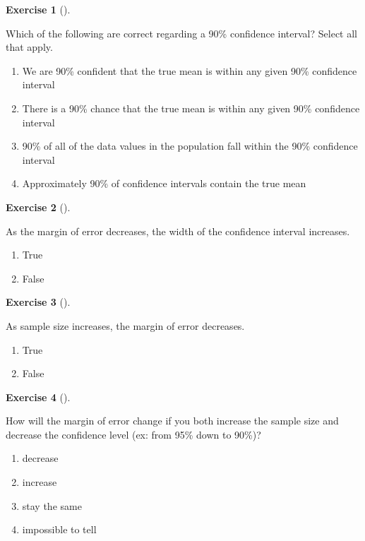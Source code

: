 \documentclass[
  letterpaper,
  DIV=11,
  numbers=noendperiod]{scrreprt}
\providecommand{\tightlist}{%
  \setlength{\itemsep}{0pt}\setlength{\parskip}{0pt}}\usepackage{longtable,booktabs,array}
\theoremstyle{definition}
\newtheorem{exercise}{Exercise}[chapter]
\theoremstyle{remark}
\begin{document}
\begin{exercise}[]\protect\hypertarget{exr-ch10-c02}{}\label{exr-ch10-c02}

Which of the following are correct regarding a 90\% confidence interval?
Select all that apply.

\begin{enumerate}
\def\labelenumi{\alph{enumi})}
\tightlist
\item
  We are 90\% confident that the true mean is within any given 90\%
  confidence interval
\item
  There is a 90\% chance that the true mean is within any given 90\%
  confidence interval
\item
  90\% of all of the data values in the population fall within the 90\%
  confidence interval
\item
  Approximately 90\% of confidence intervals contain the true mean
\end{enumerate}

\end{exercise}

\begin{exercise}[]\protect\hypertarget{exr-ch10-c03}{}\label{exr-ch10-c03}

As the margin of error decreases, the width of the confidence interval
increases.

\begin{enumerate}
\def\labelenumi{\alph{enumi})}
\tightlist
\item
  True
\item
  False
\end{enumerate}

\end{exercise}

\begin{exercise}[]\protect\hypertarget{exr-ch10-c04}{}\label{exr-ch10-c04}

As sample size increases, the margin of error decreases.

\begin{enumerate}
\def\labelenumi{\alph{enumi})}
\tightlist
\item
  True
\item
  False
\end{enumerate}

\end{exercise}

\begin{exercise}[]\protect\hypertarget{exr-ch10-c05}{}\label{exr-ch10-c05}

How will the margin of error change if you both increase the sample size
and decrease the confidence level (ex: from 95\% down to 90\%)?

\begin{enumerate}
\def\labelenumi{\alph{enumi})}
\tightlist
\item
  decrease
\item
  increase
\item
  stay the same
\item
  impossible to tell
\end{enumerate}

\end{exercise}
\end{document}
